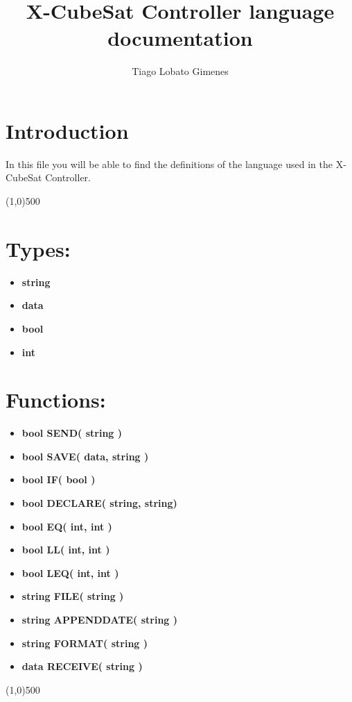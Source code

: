 \documentclass[11pt,a4paper]{article}
\author{Tiago Lobato Gimenes}
\title{X-CubeSat Controller language documentation}
\begin{document}
\maketitle

\section*{Introduction}
In this file you will be able to find the definitions of the language used in the X-CubeSat Controller.

\begin{center}
\line(1,0){500}
\end{center}

\section*{Types:}
\begin{itemize}
\item \textbf{string}
\item \textbf{data}
\item \textbf{bool}
\item \textbf{int}
\end{itemize}

\section*{Functions:}
\begin{itemize}
\item \textbf{bool SEND( string )}
\item \textbf{bool SAVE( data, string )}
\item \textbf{bool IF( bool )}
\item \textbf{bool DECLARE( string, string)}
\item \textbf{bool EQ( int, int )}
\item \textbf{bool LL( int, int )}
\item \textbf{bool LEQ( int, int )}
\item \textbf{string FILE( string )}
\item \textbf{string APPENDDATE( string )}
\item \textbf{string FORMAT( string )}
\item \textbf{data RECEIVE( string )}
\end{itemize}

\begin{center}
\line(1,0){500}
\end{center}
\end{document}
